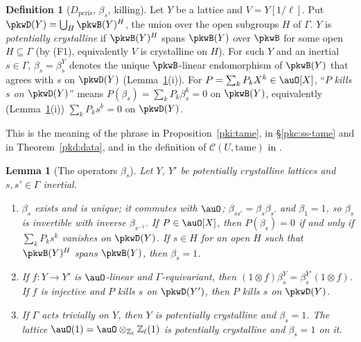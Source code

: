 \documentclass[10pt]{amsart}
\newtheorem{lemma}[theorem]{Lemma}
\theoremstyle{definition}
\newtheorem{definition}[theorem]{Definition}
\theoremstyle{remark}
\newcommand{\Z}{\mathbb Z}
\begin{document}
\begin{definition}[$D_{\mathrm{pcris}}$, $\beta_s$, killing]\label{pkw:def-pcris}
Let $Y$ be a lattice and $V=Y[1/\ell]$. Put $\pkwD(Y)=\bigcup_H\pkwB(Y)^H$, the union over the open
subgroups $H$ of $\Gamma$. $Y$ is \emph{potentially crystalline} if $\pkwB(Y)^H$ spans $\pkwB(Y)$ over
$\pkwB$ for some open $H\subseteq\Gamma$ (by (F1), equivalently $V$ is crystalline on $H$). For such $Y$
and an inertial $s\in\Gamma$, $\beta_s=\beta_s^Y$ denotes the unique $\pkwB$-linear endomorphism of
$\pkwB(Y)$ that agrees with $s$ on $\pkwD(Y)$ (Lemma~\ref{pkw:beta}(i)). For $P=\sum_kP_kX^k\in\auO[X]$,
``$P$ \emph{kills $s$ on $\pkwD(Y)$}'' means $P(\beta_s)=\sum_kP_k\beta_s^k=0$ on $\pkwB(Y)$,
equivalently (Lemma~\ref{pkw:beta}(i)) $\sum_kP_ks^k=0$ on $\pkwD(Y)$.
\end{definition}

This is the meaning of the phrase in Proposition~\ref{pki:tame}, in \S\ref{pkc:ss-tame} and in
Theorem~\ref{pkd:data}, and in the definition of $\mathcal C(U,\mathrm{tame})$ in {\cite[\S5.1]{P55}}.

\begin{lemma}[The operators $\beta_s$]\label{pkw:beta}
Let $Y$, $Y'$ be potentially crystalline lattices and $s,s'\in\Gamma$ inertial.
\begin{enumerate}
\item[(i)] $\beta_s$ exists and is unique; it commutes with $\auO$; $\beta_{ss'}=\beta_s\beta_{s'}$ and
$\beta_1=1$, so $\beta_s$ is invertible with inverse $\beta_{s^{-1}}$. If $P\in\auO[X]$, then
$P(\beta_s)=0$ if and only if $\sum_kP_ks^k$ vanishes on $\pkwD(Y)$. If $s\in H$ for an open $H$ such that
$\pkwB(Y)^H$ spans $\pkwB(Y)$, then $\beta_s=1$.
\item[(ii)] If $f\colon Y\to Y'$ is $\auO$-linear and $\Gamma$-equivariant, then $(1\otimes f)\beta^Y_s=
\beta^{Y'}_s(1\otimes f)$. If $f$ is injective and $P$ kills $s$ on $\pkwD(Y')$, then $P$ kills $s$ on
$\pkwD(Y)$.
\item[(iii)] If $\Gamma$ acts trivially on $Y$, then $Y$ is potentially crystalline and $\beta_s=1$. The
lattice $\auO(1)=\auO\otimes_{\Z_\ell}\Z_\ell(1)$ is potentially crystalline and $\beta_s=1$ on it.
\end{enumerate}
\end{lemma}
\end{document}
